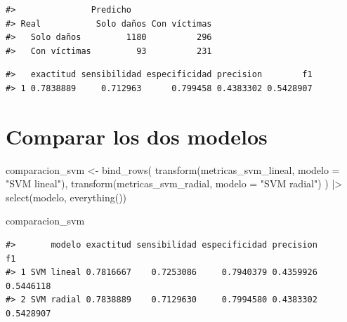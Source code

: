 \documentclass[
  spanish,
  10.5pt,
  letterpaper,
  openany,
  headings=big]{scrbook}
\newenvironment{Shaded}{}{}
\newcommand{\AttributeTok}[1]{\textcolor[rgb]{0.84,0.23,0.29}{#1}}
\newcommand{\FunctionTok}[1]{\textcolor[rgb]{0.44,0.26,0.76}{#1}}
\newcommand{\NormalTok}[1]{\textcolor[rgb]{0.14,0.16,0.18}{#1}}
\newcommand{\OtherTok}[1]{\textcolor[rgb]{0.44,0.26,0.76}{#1}}
\newcommand{\SpecialCharTok}[1]{\textcolor[rgb]{0.00,0.36,0.77}{#1}}
\newcommand{\StringTok}[1]{\textcolor[rgb]{0.01,0.18,0.38}{#1}}
\begin{document}
\begin{verbatim}
#>               Predicho
#> Real           Solo daños Con víctimas
#>   Solo daños         1180          296
#>   Con víctimas         93          231
\end{verbatim}

\begin{Shaded}
\end{Shaded}

\begin{verbatim}
#>   exactitud sensibilidad especificidad precision        f1
#> 1 0.7838889     0.712963      0.799458 0.4383302 0.5428907
\end{verbatim}

\section{Comparar los dos modelos}\label{comparar-los-dos-modelos}

\begin{Shaded}
\begin{Highlighting}[]
\NormalTok{comparacion\_svm }\OtherTok{\textless{}{-}} \FunctionTok{bind\_rows}\NormalTok{(}
  \FunctionTok{transform}\NormalTok{(metricas\_svm\_lineal, }\AttributeTok{modelo =} \StringTok{"SVM lineal"}\NormalTok{),}
  \FunctionTok{transform}\NormalTok{(metricas\_svm\_radial, }\AttributeTok{modelo =} \StringTok{"SVM radial"}\NormalTok{)}
\NormalTok{) }\SpecialCharTok{|\textgreater{}}
  \FunctionTok{select}\NormalTok{(modelo, }\FunctionTok{everything}\NormalTok{())}

\NormalTok{comparacion\_svm}
\end{Highlighting}
\end{Shaded}

\begin{verbatim}
#>       modelo exactitud sensibilidad especificidad precision        f1
#> 1 SVM lineal 0.7816667    0.7253086     0.7940379 0.4359926 0.5446118
#> 2 SVM radial 0.7838889    0.7129630     0.7994580 0.4383302 0.5428907
\end{verbatim}
\end{document}
